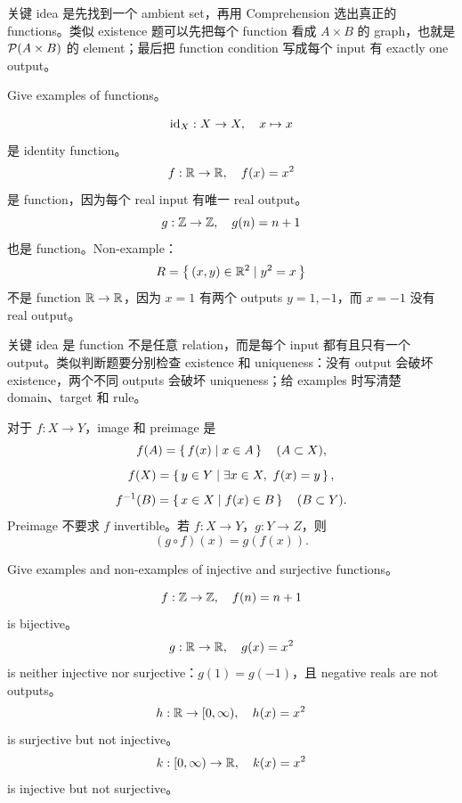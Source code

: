 \begin{explanation}
关键 idea 是先找到一个 ambient set，再用 Comprehension 选出真正的 functions。类似 existence 题可以先把每个 function 看成 \(A\times B\) 的 graph，也就是 \(\mathcal{P}(A\times B)\) 的 element；最后把 function condition 写成每个 input 有 exactly one output。
\end{explanation}

\begin{exerciseblock}
Give examples of functions。
\end{exerciseblock}

\begin{solution}
\[
\mathrm{id}_X:X\to X,\quad x\mapsto x
\]
是 identity function。
\[
f:\mathbb{R}\to\mathbb{R},\quad f(x)=x^2
\]
是 function，因为每个 real input 有唯一 real output。
\[
g:\mathbb{Z}\to\mathbb{Z},\quad g(n)=n+1
\]
也是 function。Non-example：
\[
R=\left\{\,(x,y)\in\mathbb{R}^2\mid y^2=x\,\right\}
\]
不是 function \(\mathbb{R}\to\mathbb{R}\)，因为 \(x=1\) 有两个 outputs \(y=1,-1\)，而 \(x=-1\) 没有 real output。
\end{solution}

\begin{explanation}
关键 idea 是 function 不是任意 relation，而是每个 input 都有且只有一个 output。类似判断题要分别检查 existence 和 uniqueness：没有 output 会破坏 existence，两个不同 outputs 会破坏 uniqueness；给 examples 时写清楚 domain、target 和 rule。
\end{explanation}

对于 \(f:X\to Y\)，image 和 preimage 是
\[
f(A)=\left\{\,f(x)\mid x\in A\,\right\}\quad(A\subset X),
\]
\[
f(X)=\setbuilder{y\in Y}{\exists x\in X,\ f(x)=y},
\]
\[
f^{-1}(B)=\left\{\,x\in X\mid f(x)\in B\,\right\}\quad(B\subset Y).
\]
Preimage 不要求 \(f\) invertible。若 \(f:X\to Y\)，\(g:Y\to Z\)，则
\[
(g\circ f)(x)=g(f(x)).
\]

\begin{exerciseblock}
Give examples and non-examples of injective and surjective functions。
\end{exerciseblock}

\begin{solution}
\[
f:\mathbb{Z}\to\mathbb{Z},\quad f(n)=n+1
\]
is bijective。
\[
g:\mathbb{R}\to\mathbb{R},\quad g(x)=x^2
\]
is neither injective nor surjective：\(g(1)=g(-1)\)，且 negative reals are not outputs。
\[
h:\mathbb{R}\to[0,\infty),\quad h(x)=x^2
\]
is surjective but not injective。
\[
k:[0,\infty)\to\mathbb{R},\quad k(x)=x^2
\]
is injective but not surjective。
\end{solution}

